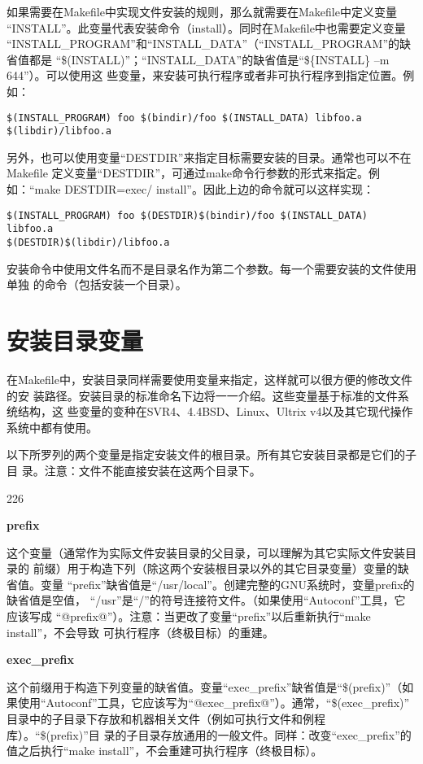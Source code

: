 如果需要在Makefile中实现文件安装的规则，那么就需要在Makefile中定义变量
“INSTALL”。此变量代表安装命令（install）。同时在Makefile中也需要定义变量
“INSTALL\_PROGRAM”和“INSTALL\_DATA”（“INSTALL\_PROGRAM”的缺省值都是
“\$(INSTALL)”；“INSTALL\_DATA”的缺省值是“\$\{INSTALL\} –m 644”）。可以使用这
些变量，来安装可执行程序或者非可执行程序到指定位置。例如：

\begin{Verbatim}[]
$(INSTALL_PROGRAM) foo $(bindir)/foo $(INSTALL_DATA) libfoo.a
$(libdir)/libfoo.a
\end{Verbatim}

另外，也可以使用变量“DESTDIR”来指定目标需要安装的目录。通常也可以不在Makefile
定义变量“DESTDIR”，可通过make命令行参数的形式来指定。例如：“make
DESTDIR=exec/ install”。因此上边的命令就可以这样实现：

\begin{Verbatim}[]
$(INSTALL_PROGRAM) foo $(DESTDIR)$(bindir)/foo $(INSTALL_DATA) libfoo.a
$(DESTDIR)$(libdir)/libfoo.a
\end{Verbatim}

安装命令中使用文件名而不是目录名作为第二个参数。每一个需要安装的文件使用单独
的命令（包括安装一个目录）。

\section{安装目录变量}
在Makefile中，安装目录同样需要使用变量来指定，这样就可以很方便的修改文件的安
装路径。安装目录的标准命名下边将一一介绍。这些变量基于标准的文件系统结构，这
些变量的变种在SVR4、4.4BSD、Linux、Ultrix v4以及其它现代操作系统中都有使用。

以下所罗列的两个变量是指定安装文件的根目录。所有其它安装目录都是它们的子目
录。注意：文件不能直接安装在这两个目录下。

\begin{dinglist}{226}
\itemsep=4pt \parskip=0pt

\item \textbf{prefix}

这个变量（通常作为实际文件安装目录的父目录，可以理解为其它实际文件安装目录的
前缀）用于构造下列（除这两个安装根目录以外的其它目录变量）变量的缺省值。变量
“prefix”缺省值是“/usr/local”。创建完整的GNU系统时，变量prefix的缺省值是空值，
“/usr”是“/”的符号连接符文件。（如果使用“Autoconf”工具，它应该写成
“@prefix@”）。注意：当更改了变量“prefix”以后重新执行“make install”，不会导致
可执行程序（终极目标）的重建。

\item \textbf{exec\_prefix}

这个前缀用于构造下列变量的缺省值。变量“exec\_prefix”缺省值是“\$(prefix)”（如
果使用“Autoconf”工具，它应该写为“@exec\_prefix@”）。通常，“\$(exec\_prefix)”
目录中的子目录下存放和机器相关文件（例如可执行文件和例程库）。“\$(prefix)”目
录的子目录存放通用的一般文件。同样：改变“exec\_prefix”的值之后执行“make
install”，不会重建可执行程序（终极目标）。

\end{dinglist}

